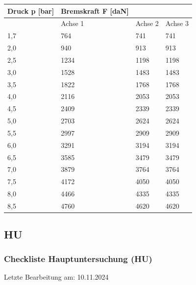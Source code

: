 \documentclass{vorlage-design-main}
\begin{document}
\begin{table}[ht]
  \begin{tabular}{@{}llll@{}}
  \toprule

Druck p {[}bar{]} & Bremskraft F {[}daN{]} & & \\
\midrule[\heavyrulewidth]
& Achse 1 & Achse 2 & Achse 3 \\
1,7 & 764 & 741 & 741 \\
2,0 & 940 & 913 & 913 \\
2,5 & 1234 & 1198 & 1198 \\
3,0 & 1528 & 1483 & 1483 \\
3,5 & 1822 & 1768 & 1768 \\
4,0 & 2116 & 2053 & 2053 \\
4,5 & 2409 & 2339 & 2339 \\
5,0 & 2703 & 2624 & 2624 \\
5,5 & 2997 & 2909 & 2909 \\
6,0 & 3291 & 3194 & 3194 \\
6,5 & 3585 & 3479 & 3479 \\
7,0 & 3879 & 3764 & 3764 \\
7,5 & 4172 & 4050 & 4050 \\
8,0 & 4466 & 4335 & 4335 \\
8,5 & 4760 & 4620 & 4620 \\
  \bottomrule
  \end{tabular}%
\end{table}

\newpage

\subsection{HU}\label{hu}

\subsubsection{Checkliste Hauptuntersuchung
(HU)}\label{checkliste-hauptuntersuchung-hu}

Letzte Bearbeitung am: 10.11.2024
\end{document}
